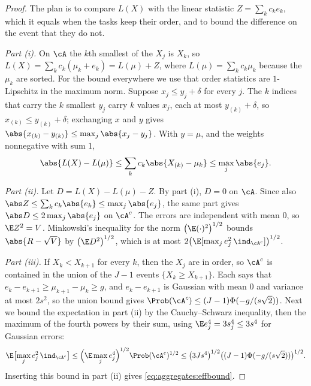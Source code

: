 \begin{refsection}
\begin{proof}
The plan is to compare $L(X)$ with the linear statistic $Z=\sum_kc_ke_k$, which it equals when the tasks keep their order, and to bound the difference on the event that they do not.

\emph{Part (i).} On $\cA$ the $k$th smallest of the $X_j$ is $X_k$, so $L(X)=\sum_kc_k(\mu_k+e_k)=L(\mu)+Z$, where $L(\mu)=\sum_kc_k\mu_k$ because the $\mu_k$ are sorted. For the bound everywhere we use that order statistics are $1$-Lipschitz in the maximum norm. Suppose $x_j\le y_j+\delta$ for every $j$. The $k$ indices that carry the $k$ smallest $y_j$ carry $k$ values $x_j$, each at most $y_{(k)}+\delta$, so $x_{(k)}\le y_{(k)}+\delta$; exchanging $x$ and $y$ gives $\abs{x_{(k)}-y_{(k)}}\le\max_j\abs{x_j-y_j}$. With $y=\mu$, and the weights nonnegative with sum $1$,
\[
  \abs{L(X)-L(\mu)}\le\sum_kc_k\abs{X_{(k)}-\mu_k}\le\max_j\abs{e_j}.
\]

\emph{Part (ii).} Let $D=L(X)-L(\mu)-Z$. By part (i), $D=0$ on $\cA$. Since also $\abs Z\le\sum_kc_k\abs{e_k}\le\max_j\abs{e_j}$, the same part gives $\abs D\le2\max_j\abs{e_j}$ on $\cA^c$. The errors are independent with mean $0$, so $\E Z^2=V$. Minkowski's inequality for the norm $\bigl(\E(\cdot)^2\bigr)^{1/2}$ bounds $\abs{R-\sqrt V}$ by $\bigl(\E D^2\bigr)^{1/2}$, which is at most $2\bigl(\E[\max_je_j^2\,\ind_{\cA^c}]\bigr)^{1/2}$.

\emph{Part (iii).} If $X_k<X_{k+1}$ for every $k$, then the $X_j$ are in order, so $\cA^c$ is contained in the union of the $J-1$ events $\{X_k\ge X_{k+1}\}$. Each says that $e_k-e_{k+1}\ge\mu_{k+1}-\mu_k\ge g$, and $e_k-e_{k+1}$ is Gaussian with mean $0$ and variance at most $2s^2$, so the union bound gives $\Prob(\cA^c)\le(J-1)\Phi(-g/(s\sqrt2))$. Next we bound the expectation in part (ii) by the Cauchy--Schwarz inequality, then the maximum of the fourth powers by their sum, using $\E e_j^4=3s_j^4\le3s^4$ for Gaussian errors:
\[
  \E\bigl[\max_je_j^2\,\ind_{\cA^c}\bigr]\le\Bigl(\E\max_je_j^4\Bigr)^{1/2}\Prob(\cA^c)^{1/2}\le\bigl(3Js^4\bigr)^{1/2}\bigl((J-1)\Phi(-g/(s\sqrt2))\bigr)^{1/2}.
\]
Inserting this bound in part (ii) gives \eqref{eq:aggregates:effbound}.
\end{proof}


\end{refsection}
